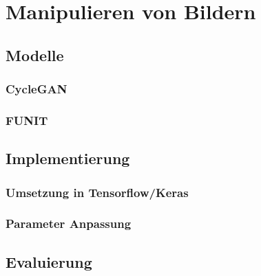 \chapter{Manipulieren von Bildern}\label{chp:bildmanipulation} %
\glsresetall

 \section{Modelle} %
 
\subsection{CycleGAN}%
 
 \subsection{FUNIT}%
 
 \section{Implementierung} %
 
 \subsection{Umsetzung in Tensorflow/Keras}
 
 \subsection{Parameter Anpassung} %
 
 \section{Evaluierung} %